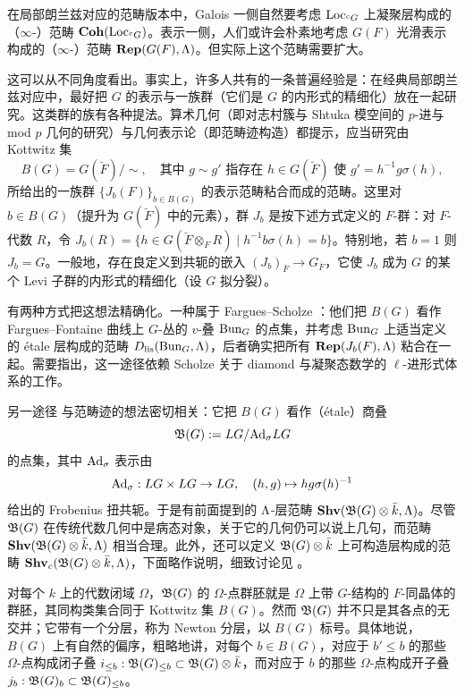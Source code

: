 在局部朗兰兹对应的范畴版本中，Galois 一侧自然要考虑 ${\operatorname{Loc}}_{{}^cG}$ 上凝聚层构成的（$\infty$-）范畴 ${\mathbf{Coh}}({\operatorname{Loc}}_{{}^cG})$。表示一侧，人们或许会朴素地考虑 $G(F)$ 光滑表示构成的（$\infty$-）范畴 ${\mathbf{Rep}}(G(F),{\Lambda})$。但实际上这个范畴需要扩大。

这可以从不同角度看出。事实上，许多人共有的一条普遍经验是：在经典局部朗兰兹对应中，最好把 $G$ 的表示与一族群（它们是 $G$ 的内形式的精细化）放在一起研究。这类群的族有各种提法。算术几何（即对志村簇与 Shtuka 模空间的 $p$-进与 mod $p$ 几何的研究）与几何表示论（即范畴迹构造）都提示，应当研究由 Kottwitz 集
\[
B(G) = G(\breve F)/\sim, \quad \mbox{其中 } g\sim g' \mbox{ 指存在 } h\in G(\breve F) \mbox{ 使 } g'=h^{-1}g\sigma(h),
\]
所给出的一族群 $\{J_b(F)\}_{b\in B(G)}$ 的表示范畴粘合而成的范畴。这里对 $b\in B(G)$（提升为 $G(\breve F)$ 中的元素），群 $J_b$ 是按下述方式定义的 $F$-群：对 $F$-代数 $R$，令 $J_b(R)=\{h\in G(\breve F\otimes_FR)\mid h^{-1}b\sigma(h)=b\}$。特别地，若 $b=1$ 则 $J_b=G$。一般地，存在良定义到共轭的嵌入 $(J_{b})_{\overline{F}}\to G_{\overline{F}}$，它使 $J_b$ 成为 $G$ 的某个 Levi 子群的内形式的精细化（设 $G$ 拟分裂）。

有两种方式把这想法精确化。一种属于 Fargues--Scholze \cite{Fargues-Scholze-Geometrization}：他们把 $B(G)$ 看作 Fargues--Fontaine 曲线上 $G$-丛的 $v$-叠 ${\operatorname{Bun}}_G$ 的点集，并考虑 ${\operatorname{Bun}}_G$ 上适当定义的 étale 层构成的范畴 $D_{\operatorname{lis}}({\operatorname{Bun}}_G,{\Lambda})$，后者确实把所有 ${\mathbf{Rep}}(J_b(F),{\Lambda})$ 粘合在一起。需要指出，这一途径依赖 Scholze 关于 diamond 与凝聚态数学的 $\ell$-进形式体系的工作。

另一途径 \cite{Xiao-Zhu-Cycle, Zhu-CDM, Zhu-Conjecture, Hemo-Zhu-Unipotent} 与范畴迹的想法密切相关：它把 $B(G)$ 看作（étale）商叠
\begin{equation*}\label{E: kot stack}
{\mathfrak B}(G):=LG/{\operatorname{Ad}}_\sigma LG
\end{equation*}
的点集，其中 ${\operatorname{Ad}}_\sigma$ 表示由
\[
{\operatorname{Ad}}_\sigma: LG\times LG\to LG,\quad  (h,g)\mapsto hg\sigma(h)^{-1}
\]
给出的 Frobenius 扭共轭。于是有前面提到的 ${\Lambda}$-层范畴 ${\mathbf{Shv}}({{\mathfrak B}}(G)\otimes \bar{k},{\Lambda})$。尽管 ${{\mathfrak B}}(G)$ 在传统代数几何中是病态对象，关于它的几何仍可以说上几句，而范畴 ${\mathbf{Shv}}({\mathfrak B}(G)\otimes \bar{k},{\Lambda})$ 相当合理。此外，还可以定义 ${\mathfrak B}(G)\otimes \bar{k}$ 上可构造层构成的范畴 ${\mathbf{Shv}}_c({\mathfrak B}(G)\otimes \bar{k},{\Lambda})$，下面略作说明，细致讨论见 \cite{Hemo-Zhu-Unipotent}。

对每个 $k$ 上的代数闭域 $\Omega$，${{\mathfrak B}}(G)$ 的 $\Omega$-点群胚就是 $\Omega$ 上带 $G$-结构的 $F$-同晶体的群胚，其同构类集合同于 Kottwitz 集 $B(G)$。然而 ${{\mathfrak B}}(G)$ 并不只是其各点的无交并；它带有一个分层，称为 Newton 分层，以 $B(G)$ 标号。具体地说，$B(G)$ 上有自然的偏序，粗略地讲，对每个 $b\in B(G)$，对应于 $b'\leq b$ 的那些 $\Omega$-点构成闭子叠 $i_{\leq b}: {{\mathfrak B}}(G)_{\leq b}\subset {{\mathfrak B}}(G)\otimes \bar k$，而对应于 $b$ 的那些 $\Omega$-点构成开子叠 $j_{b}: {{\mathfrak B}}(G)_b\subset {{\mathfrak B}}(G)_{\leq b}$。

